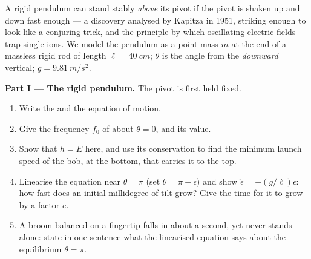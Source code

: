 \begin{problem}\label{pb:b3:lagrangian-mechanics:1}
A rigid pendulum can stand stably \emph{above} its pivot if the pivot
is shaken up and down fast enough --- a discovery analysed by Kapitza
in 1951, striking enough to look like a conjuring trick, and the
principle by which oscillating electric fields trap single ions. We
model the pendulum as a point mass $m$ at the end of a massless rigid
rod of length $\ell = \qty{40}{cm}$; $\theta$ is the angle from the
\emph{downward} vertical; $g = \qty{9.81}{m/s^2}$.

\medskip\noindent\textbf{Part I --- The rigid pendulum.}
The pivot is first held fixed.
\begin{enumerate}
  \item Write the  and the equation of motion.
  \item Give the frequency $f_0$ of  about $\theta =
        0$, and its value.
  \item Show that $h = E$ here, and use its conservation to find the
        minimum launch speed of the bob, at the bottom, that carries
        it to the top.
  \item Linearise the equation near $\theta = \pi$ (set $\theta = \pi +
        \epsilon$) and show $\ddot\epsilon = +(g/\ell)\epsilon$: how
        fast does an initial millidegree of tilt grow? Give the time
        for it to grow by a factor $e$.
  \item A broom balanced on a fingertip falls in about a second, yet
        never stands alone: state in one sentence what the linearised
        equation says about the equilibrium $\theta = \pi$.
\end{enumerate}


\end{problem}
